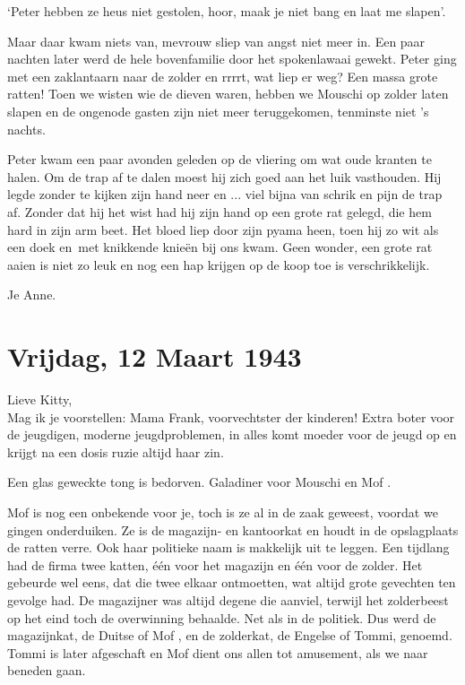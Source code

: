 \documentclass{book}
\begin{document}
`Peter hebben ze heus niet gestolen, hoor, maak je niet bang en laat me slapen'.

Maar daar kwam niets van, mevrouw sliep van angst niet meer in. Een paar nachten
later werd de hele bovenfamilie door het spokenlawaai gewekt.  Peter ging met
een zaklantaarn naar de zolder en rrrrt, wat liep er weg?  Een massa grote
ratten! Toen we wisten wie de dieven waren, hebben we Mouschi op zolder laten
slapen en de ongenode gasten zijn niet meer teruggekomen, tenminste niet 's
nachts.

Peter kwam een paar avonden geleden op de vliering om wat oude kranten te halen.
Om de trap af te dalen moest hij zich goed aan het luik vasthouden. Hij legde
zonder te kijken zijn hand neer en ... viel bijna van schrik en pijn de trap af.
Zonder dat hij het wist had hij zijn hand op een grote rat gelegd, die hem hard
in zijn arm beet. Het bloed liep door zijn pyama heen, toen hij zo wit als een
doek en~met knikkende knieën bij ons kwam. Geen wonder, een grote rat aaien is
niet zo leuk en nog een hap krijgen op de koop toe is verschrikkelijk.

Je Anne.

\section*{Vrijdag, 12 Maart 1943}

Lieve Kitty,\\
Mag ik je voorstellen: Mama Frank, voorvechtster der kinderen!
Extra boter voor de jeugdigen, moderne jeugdproblemen, in alles komt moeder voor
de jeugd op en krijgt na een dosis ruzie altijd haar zin.

Een glas geweckte tong is bedorven. Galadiner voor Mouschi en Mof .

Mof is nog een onbekende voor je, toch is ze al in de zaak geweest, voordat we
gingen onderduiken. Ze is de magazijn- en kantoorkat en houdt in de opslagplaats
de ratten verre. Ook haar politieke naam is makkelijk uit te leggen. Een
tijdlang had de firma twee katten, één voor het magazijn en één voor de zolder.
Het gebeurde wel eens, dat die twee elkaar ontmoetten, wat altijd grote
gevechten ten gevolge had. De magazijner was altijd degene die aanviel, terwijl
het zolderbeest op het eind toch de overwinning behaalde. Net als in de
politiek. Dus werd de magazijnkat, de Duitse of Mof , en de zolderkat, de
Engelse of Tommi, genoemd. Tommi is later afgeschaft en Mof dient ons allen tot
amusement, als we naar beneden gaan.
\end{document}
